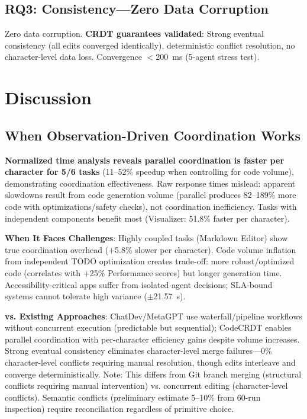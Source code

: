 \documentclass{article}
\begin{document}
\subsection{RQ3: Consistency---Zero Data Corruption}

Zero data corruption. \textbf{CRDT guarantees validated}: Strong eventual consistency (all edits converged identically), deterministic conflict resolution, no character-level data loss. Convergence $<$200~ms (5-agent stress test).

\section{Discussion}
\label{sec:discussion}

\subsection{When Observation-Driven Coordination Works}

\textbf{Normalized time analysis reveals parallel coordination is faster per character for 5/6 tasks} (11--52\% speedup when controlling for code volume), demonstrating coordination effectiveness. Raw response times mislead: apparent slowdowns result from code generation volume (parallel produces 82--189\% more code with optimizations/safety checks), not coordination inefficiency. Tasks with independent components benefit most (Visualizer: 51.8\% faster per character).

\textbf{When It Faces Challenges}: Highly coupled tasks (Markdown Editor) show true coordination overhead (+5.8\% slower per character). Code volume inflation from independent TODO optimization creates trade-off: more robust/optimized code (correlates with +25\% Performance scores) but longer generation time. Accessibility-critical apps suffer from isolated agent decisions; SLA-bound systems cannot tolerate high variance ($\pm$21.57~s).

\textbf{vs. Existing Approaches}: ChatDev/MetaGPT use waterfall/pipeline workflows without concurrent execution (predictable but sequential); CodeCRDT enables parallel coordination with per-character efficiency gains despite volume increases. Strong eventual consistency eliminates character-level merge failures---0\% character-level conflicts requiring manual resolution, though edits interleave and converge deterministically. Note: This differs from Git branch merging (structural conflicts requiring manual intervention) vs. concurrent editing (character-level conflicts). Semantic conflicts (preliminary estimate 5--10\% from 60-run inspection) require reconciliation regardless of primitive choice.
\end{document}
